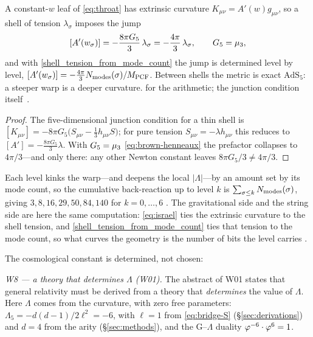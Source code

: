 \begin{proposition}\label{prop:israel}
A constant-$w$ leaf of \eqref{eq:throat} has extrinsic curvature $K_{\mu\nu}=A'(w)g_{\mu\nu}$, so a
shell of tension $\lambda_\sigma$ imposes the jump
\begin{equation}\label{eq:israel}
  [A'(w_\sigma)]=-\frac{8\pi G_5}{3}\,\lambda_\sigma=-\frac{4\pi}{3}\,\lambda_\sigma,
  \qquad G_5=\mu_{3},
\end{equation}
and with \eqref{shell_tension_from_mode_count} the jump is determined level by level,
$[A'(w_\sigma)]=-\tfrac{4\pi}{3}N_{\mathrm{modes}}(\sigma)/M_{\mathrm{PCF}}$. Between shells the metric is exact
$\mathrm{AdS}_5$: a steeper warp is a deeper curvature.
for the arithmetic; the junction condition itself~\cite{Israel66}.


\end{proposition}
\begin{proof}
The five-dimensional junction condition for a thin shell is
$[K_{\mu\nu}]=-8\pi G_5\bigl(S_{\mu\nu}-\tfrac13h_{\mu\nu}S\bigr)$; for pure tension
$S_{\mu\nu}=-\lambda h_{\mu\nu}$ this reduces to $[A']=-\tfrac{8\pi G_5}{3}\lambda$. With
$G_5=\mu_{3}$ \eqref{eq:brown-henneaux} the prefactor collapses to $4\pi/3$---and only there: any
other Newton constant leaves $8\pi G_5/3\neq4\pi/3$.
\end{proof}

\begin{remark}\label{rmk:backreaction}
Each level kinks the warp---and deepens the local $|\Lambda|$---by an amount set by its mode count,
so the cumulative back-reaction up to level $k$ is $\sum_{\sigma\le k}N_{\mathrm{modes}}(\sigma)$, giving
$3,8,16,29,50,84,140$ for $k=0,\dots,6$ . The gravitational side and the string side are here the
same computation: \eqref{eq:israel} ties the extrinsic curvature to the shell tension, and
\eqref{shell_tension_from_mode_count} ties that tension to the mode count, so what curves the geometry is the
number of bits the level carries .
\end{remark}

\noindent The cosmological constant is determined, not chosen:

\emph{W8 --- a theory that determines $\Lambda$ (W01).} The abstract of W01 states that
general relativity must be derived from a theory that \emph{determines} the value of
$\Lambda$. Here $\Lambda$ comes from the curvature, with zero free parameters:
$\Lambda_5=-d(d-1)/2\ell^2=-6$, with $\ell=1$ from \eqref{eq:bridge-S} (\S\ref{sec:derivations})
and $d=4$ from the arity (\S\ref{sec:methods}), and the G--$\Lambda$ duality
$\varphi^{-6}\cdot\varphi^{6}=1$.

